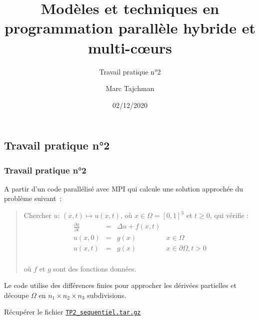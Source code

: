 \documentclass{beamer}
\title{Modèles et techniques en programmation parallèle hybride et multi-c\oe urs}
\subtitle{Travail pratique n°2}
\author{Marc Tajchman}\institute{CEA - DEN/DM2S/STMF/LMES}
\date{02/12/2020}
\newcommand\Frac[2]{\frac{\displaystyle #1}{\displaystyle #2}}
\begin{document}
\begin{frame}
	\titlepage
\end{frame}

\large
\begin{frame}
	\section{Travail pratique n°2}
	\frametitle{Travail pratique n°2}

A partir d'un code parallélisé avec MPI qui calcule une solution approchée du problème suivant~:

\medskip
\begin{quote}
Chercher $u$:  $(x, t) \mapsto u(x, t)$, où  $x \in \Omega = [0,1]^3$ et $t \geq 0$, qui vérifie :
$$
\begin{array}{lcll}
\Frac{\partial u}{\partial t} & = & \Delta u + f(x, t) & \\[0.3cm]
u(x, 0) &=& g(x) & x\in \Omega \\[0.3cm]
u(x, t) & = & g(x) & x\in\partial \Omega, t > 0\\[0.3cm]
\end{array}
$$

\vspace{-0.6cm}
où $f$ et $g$ sont des fonctions données.
\end{quote}

Le code utilise des différences finies pour approcher les dérivées partielles et découpe $\Omega$ en $n_1\times n_2\times n_3$ subdivisions.

Récupérer le fichier \href{https://perso.ensta-paris.fr/~tajchman/Seance3/TP1_sequentiel.tar.gz}{\tt TP2\_sequentiel.tar.gz}
\end{frame}
\end{document}
